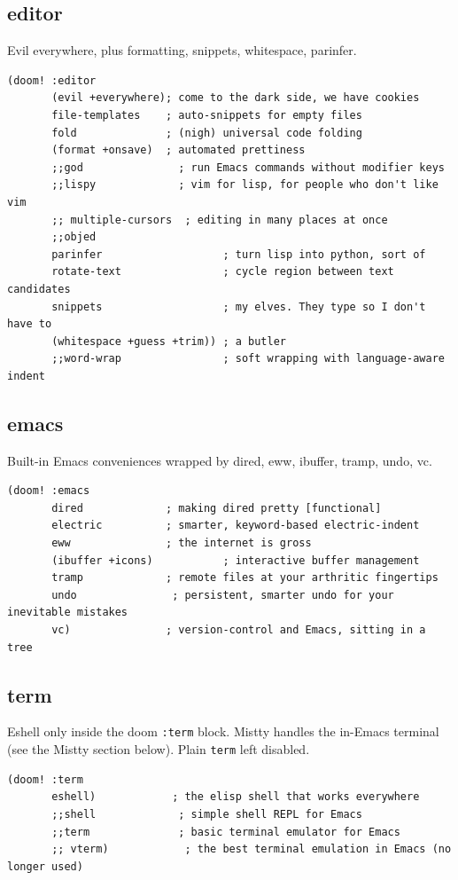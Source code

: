 \documentclass[11pt]{article}
\begin{document}
\subsection{editor}
\label{sec:orgd7ac2ff}
Evil everywhere, plus formatting, snippets, whitespace, parinfer.

\begin{verbatim}
(doom! :editor
       (evil +everywhere); come to the dark side, we have cookies
       file-templates    ; auto-snippets for empty files
       fold              ; (nigh) universal code folding
       (format +onsave)  ; automated prettiness
       ;;god               ; run Emacs commands without modifier keys
       ;;lispy             ; vim for lisp, for people who don't like vim
       ;; multiple-cursors  ; editing in many places at once
       ;;objed
       parinfer                   ; turn lisp into python, sort of
       rotate-text                ; cycle region between text candidates
       snippets                   ; my elves. They type so I don't have to
       (whitespace +guess +trim)) ; a butler
       ;;word-wrap                ; soft wrapping with language-aware indent
\end{verbatim}
\subsection{emacs}
\label{sec:org9a63355}
Built-in Emacs conveniences wrapped by dired, eww, ibuffer,
tramp, undo, vc.

\begin{verbatim}
(doom! :emacs
       dired             ; making dired pretty [functional]
       electric          ; smarter, keyword-based electric-indent
       eww               ; the internet is gross
       (ibuffer +icons)           ; interactive buffer management
       tramp             ; remote files at your arthritic fingertips
       undo               ; persistent, smarter undo for your inevitable mistakes
       vc)               ; version-control and Emacs, sitting in a tree
\end{verbatim}
\subsection{term}
\label{sec:orgfcb913e}
Eshell only inside the doom \texttt{:term} block. Mistty handles the in-Emacs
terminal (see the Mistty section below). Plain \texttt{term} left disabled.

\begin{verbatim}
(doom! :term
       eshell)            ; the elisp shell that works everywhere
       ;;shell             ; simple shell REPL for Emacs
       ;;term              ; basic terminal emulator for Emacs
       ;; vterm)            ; the best terminal emulation in Emacs (no longer used)
\end{verbatim}
\end{document}
